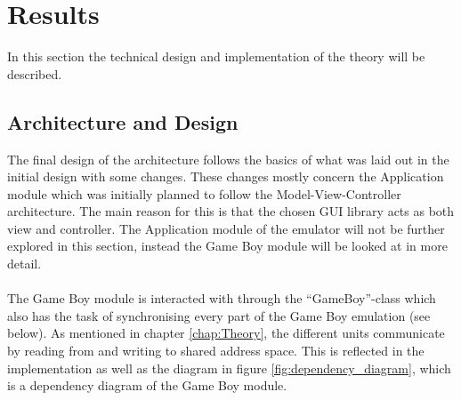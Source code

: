 \chapter{Results}


In this section the technical design and implementation of the theory will be described.

\section{Architecture and Design}
\label{sec:resultsarchitecture}
The final design of the architecture follows the basics of what was laid out in the initial design with some changes. These changes mostly concern the Application module which was initially planned to follow the Model-View-Controller architecture. The main reason for this is that the chosen GUI library acts as both view and controller. The Application module of the emulator will not be further explored in this section, instead the Game Boy module will be looked at in more detail.
\\\\
The Game Boy module is interacted with through the ``GameBoy''-class which also has the task of synchronising every part of the Game Boy emulation (see below). As mentioned in chapter \ref{chap:Theory}, the different units communicate by reading from and writing to shared address space. This is reflected in the implementation as well as the diagram in figure \ref{fig:dependency_diagram}, which is a dependency diagram of the Game Boy module.

